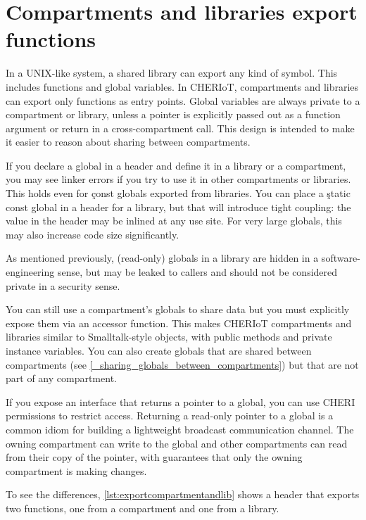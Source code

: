\section{Compartments and libraries export functions}

In a UNIX-like system, a shared library can export any kind of symbol.
This includes functions and global variables.
In CHERIoT, compartments and libraries can export only functions as entry points.
Global variables are always private to a compartment or library, unless a pointer is explicitly passed out as a function argument or return in a cross-compartment call.
This design is intended to make it easier to reason about sharing between compartments.

If you declare a global in a header and define it in a library or a compartment, you may see linker errors if you try to use it in other compartments or libraries.
This holds even for \c{const} globals exported from libraries.
You can place a \c{static const} global in a header for a library, but that will introduce tight coupling: the value in the header may be inlined at any use site.
For very large globals, this may also increase code size significantly.

\begin{note}
As mentioned previously, (read-only) globals in a library are hidden in a software-engineering sense, but may be leaked to callers and should not be considered private in a security sense.
\end{note}

You can still use a compartment's globals to share data but you must explicitly expose them via an accessor function.
This makes CHERIoT compartments and libraries similar to Smalltalk-style objects, with public methods and private instance variables.
You can also create globals that are shared between compartments (see \ref{_sharing_globals_between_compartments}) but that are not part of any compartment.

If you expose an interface that returns a pointer to a global, you can use CHERI permissions to restrict access.
Returning a read-only pointer to a global is a common idiom for building a lightweight broadcast communication channel.
The owning compartment can write to the global and other compartments can read from their copy of the pointer, with guarantees that only the owning compartment is making changes.

To see the differences, \ref{lst:exportcompartmentandlib} shows a header that exports two functions, one from a compartment and one from a library.

